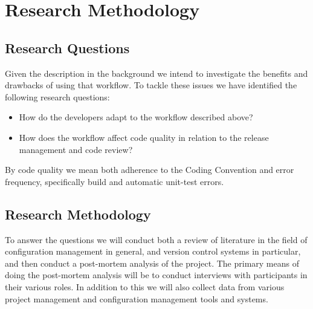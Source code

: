 \documentclass{article}
\begin{document}
%
%
%
\section{Research Methodology}

\subsection{Research Questions}
Given the description in the background we intend to investigate the
benefits and drawbacks of using that workflow. To tackle these issues
we have identified the following research questions:

\begin{itemize}
 \item How do the developers adapt to the workflow described above?
 \item How does the workflow affect code quality in relation to the
       release management and code review?
\end{itemize}

By code quality we mean both adherence to the Coding Convention and
error frequency, specifically build and automatic unit-test errors.

\subsection{Research Methodology}
To answer the questions we will conduct both a review of literature in
the field of configuration management in general, and version control
systems in particular, and then conduct a post-mortem analysis of the
project. The primary means of doing the post-mortem analysis will be
to conduct interviews with participants in their various roles. In
addition to this we will also collect data from various project
management and configuration management tools and systems.
\end{document}
